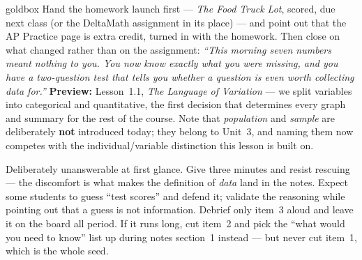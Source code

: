 \documentclass[10pt]{article}
\begin{document}
\boxguard
\begin{skillbox}{goldbox}
Hand the homework launch first --- \emph{The Food Truck Lot}, scored, due next class (or the
DeltaMath assignment in its place) --- and point out that the AP Practice page is extra credit, turned in
with the homework. Then close on what changed rather than on the assignment: \emph{``This
morning seven numbers meant nothing to you. You now know exactly what you were missing, and you
have a two-question test that tells you whether a question is even worth collecting data for.''}
\textbf{Preview:} Lesson~1.1, \emph{The Language of Variation} --- we split variables into
categorical and quantitative, the first decision that determines every graph and summary for the
rest of the course. Note that \emph{population} and \emph{sample} are deliberately \textbf{not}
introduced today; they belong to Unit~3, and naming them now competes with the
individual/variable distinction this lesson is built on.
\end{skillbox}

\begin{teachernote}[Warm-Up]
Deliberately unanswerable at first glance. Give three minutes and resist rescuing --- the
discomfort is what makes the definition of \emph{data} land in the notes. Expect some students to
guess ``test scores'' and defend it; validate the reasoning while pointing out that a guess is
not information. Debrief only item~3 aloud and leave it on the board all period. If it runs long,
cut item~2 and pick the ``what would you need to know'' list up during notes section~1 instead
--- but never cut item~1, which is the whole seed.
\end{teachernote}
\end{document}
